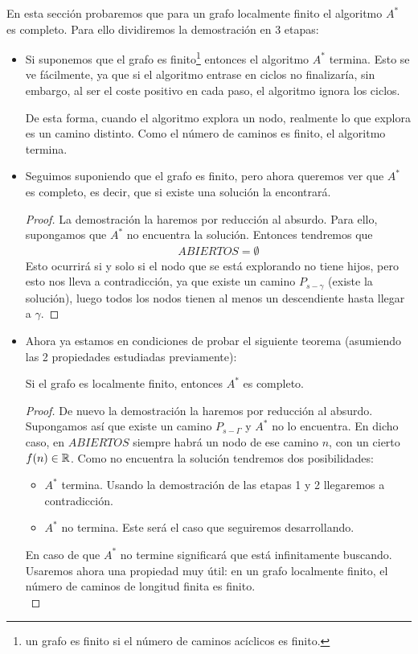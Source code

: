 En esta sección probaremos que para un grafo localmente finito el algoritmo $A^*$ es completo. Para ello dividiremos la demostración en 3 etapas:
\begin{itemize}
    \item[\textbf{Etapa 1)}] Si suponemos que el grafo es finito\footnote{un grafo es finito si el número de caminos acíclicos es finito.} entonces el algoritmo $A^*$ termina. Esto se ve fácilmente, ya que si el algoritmo entrase en ciclos no finalizaría, sin embargo, al ser el coste positivo en cada paso, el algoritmo ignora los ciclos.
    
    De esta forma, cuando el algoritmo explora un nodo, realmente lo que explora es un camino distinto. Como el número de caminos es finito, el algoritmo termina.
    
    \item[\textbf{Etapa 2)}] Seguimos suponiendo que el grafo es finito, pero ahora queremos ver que $A^*$ es completo, es decir, que si existe una solución la encontrará.
    \begin{proof}
        La demostración la haremos por reducción al absurdo. Para ello, supongamos que $A^*$ no encuentra la solución. Entonces tendremos que 
        \begin{gather*}
            ABIERTOS = \emptyset
        \end{gather*}
        Esto ocurrirá si y solo si el nodo que se está explorando no tiene hijos, pero esto nos lleva a contradicción, ya que existe un camino $P_{s-\gamma}$ (existe la solución), luego todos los nodos tienen al menos un descendiente hasta llegar a $\gamma$.
    \end{proof}

    \item[\textbf{Etapa 3)}] Ahora ya estamos en condiciones de probar el siguiente teorema (asumiendo las 2 propiedades estudiadas previamente):
    \begin{teo}[Completitud de $A^*$]
        Si el grafo es localmente finito, entonces $A^*$ es completo.

        \begin{proof}
            De nuevo la demostración la haremos por reducción al absurdo. Supongamos así que existe un camino $P_{s-\Gamma}$ y $A^*$ no lo encuentra. En dicho caso, en $ABIERTOS$ siempre habrá un nodo de ese camino $n$, con un cierto $f(n)\in \mathbb{R}$. Como no encuentra la solución tendremos dos posibilidades:
            \begin{itemize}
                \item $A^*$ termina. Usando la demostración de las etapas 1 y 2 llegaremos a contradicción.
                \item $A^*$ no termina. Este será el caso que seguiremos desarrollando.
            \end{itemize}
            En caso de que $A^*$ no termine significará que está infinitamente buscando. Usaremos ahora una propiedad muy útil: en un grafo localmente finito, el número de caminos de longitud finita es finito.\\


\end{proof}
\end{teo}
\end{itemize}
